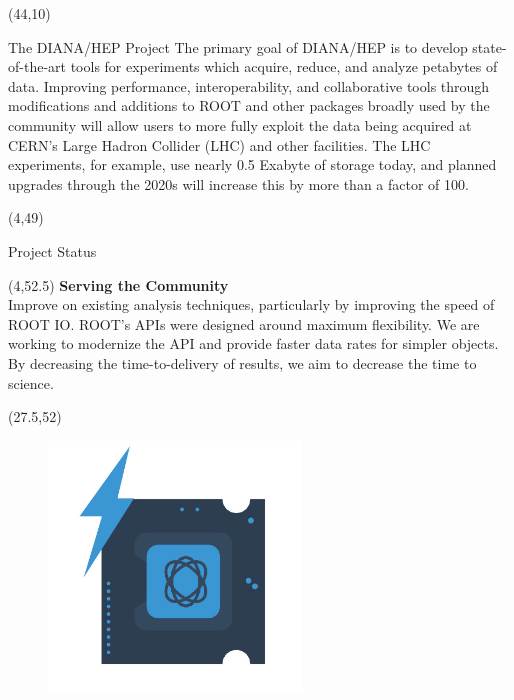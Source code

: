 \documentclass[final]{beamer}
\begin{document}
\begin{frame}{}
\begin{textblock}{38.0}(44,10)
\begin{block}{The DIANA/HEP Project}
The primary goal of DIANA/HEP is to develop state-of-the-art tools
for experiments which acquire, reduce, and analyze petabytes of
data. Improving performance, interoperability, and collaborative
tools through modifications and additions to ROOT and other packages
broadly used by the community will allow users to more fully exploit
the data being acquired at CERN's Large Hadron Collider (LHC) and
other facilities. The LHC experiments, for example, use nearly 0.5 Exabyte of
storage today, and planned upgrades through the 2020s will increase this
by more than a factor of 100. 
\end{block}
\end{textblock}

\begin{textblock}{78.0}(4,49)
\begin{block}{Project Status}
\end{block}
\end{textblock}

\begin{textblock}{22.5}(4,52.5)
\textcolor{mybluelabel}{\bf Serving the Community} \\
Improve on existing analysis techniques, particularly by improving the speed of ROOT IO.
ROOT's APIs were designed around maximum flexibility.  We are working to modernize the API
and provide faster data rates for simpler objects.
By decreasing the time-to-delivery of results, we aim to decrease the time to science.
\end{textblock}

\begin{textblock}{12.5}(27.5,52)
\begin{figure}[tbph]
\centering
\includegraphics[width=0.6\textwidth]{faster-processing.jpg}
\end{figure}
\end{textblock}


\end{frame}
\end{document}
